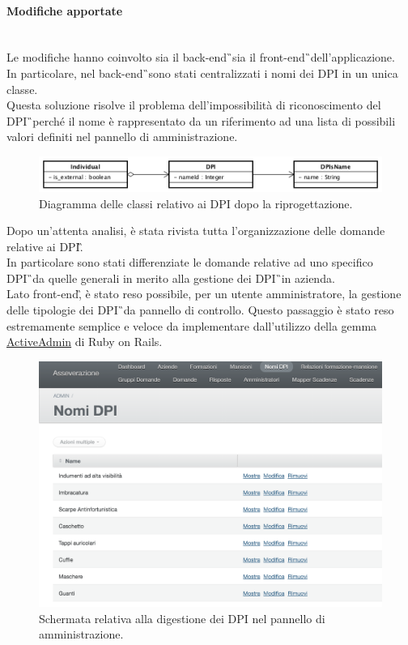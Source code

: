 \paragraph*{Modifiche apportate}\mbox{} \\
Le modifiche hanno coinvolto sia il \gls{back-end}\G\ sia  il  \gls{front-end}\G\ dell'applicazione. \\
In particolare, nel  \gls{back-end}\G\ sono stati centralizzati i nomi dei \gls{DPI} in un unica classe. \\ 
Questa soluzione risolve il problema dell'impossibilità di riconoscimento del \gls{DPI}\G\ perché il nome è rappresentato da un riferimento ad una lista di possibili valori definiti nel pannello di amministrazione. \\
\begin{figure}[H]
	\begin{center}
		\includegraphics[width=14cm]{Pics/UMLClassiDPIRiprogettato.png}
		\caption{Diagramma delle classi relativo ai DPI dopo la riprogettazione.}
		\label{fig:UMLClassiDPIriprogettato}
	\end{center}
\end{figure}

Dopo un'attenta analisi, è stata rivista tutta l'organizzazione delle domande relative ai \gls{DPI}\G.\\
In particolare sono stati differenziate le domande relative ad uno specifico \gls{DPI}\G\ da quelle generali in merito alla gestione dei \gls{DPI}\G\ in azienda.\\
Lato \gls{front-end}\G, è stato reso possibile, per un utente amministratore, la gestione delle tipologie dei \gls{DPI}\G\ da pannello di controllo. Questo passaggio è stato reso estremamente semplice e veloce da implementare dall'utilizzo della gemma \hyperref[sec:ActiveAdmin]{ActiveAdmin} di Ruby on Rails.
\newpage
\begin{figure}[H]
	\begin{center}
		\includegraphics[width=12cm]{Pics/ActiveAdminDPI}
		\caption{Schermata relativa alla digestione dei DPI nel pannello di amministrazione.}
		\label{fig:ActiveAdminDPI}
	\end{center}
\end{figure}

